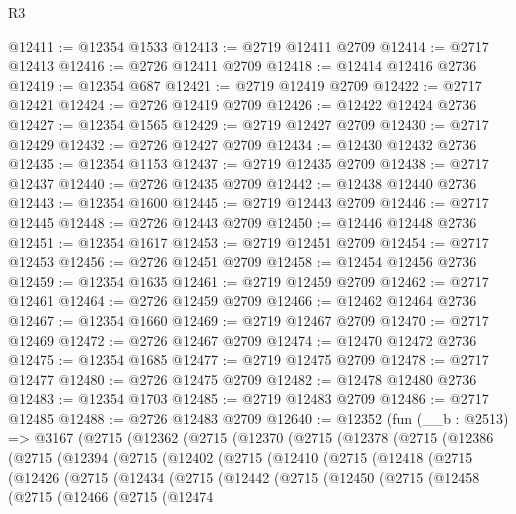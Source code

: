 \begin{lexlean}{R3}
\begin{coremodule}
@12411 := @12354 @1533
@12413 := @2719 @12411 @2709
@12414 := @2717 @12413
@12416 := @2726 @12411 @2709
@12418 := @12414 @12416 @2736
@12419 := @12354 @687
@12421 := @2719 @12419 @2709
@12422 := @2717 @12421
@12424 := @2726 @12419 @2709
@12426 := @12422 @12424 @2736
@12427 := @12354 @1565
@12429 := @2719 @12427 @2709
@12430 := @2717 @12429
@12432 := @2726 @12427 @2709
@12434 := @12430 @12432 @2736
@12435 := @12354 @1153
@12437 := @2719 @12435 @2709
@12438 := @2717 @12437
@12440 := @2726 @12435 @2709
@12442 := @12438 @12440 @2736
@12443 := @12354 @1600
@12445 := @2719 @12443 @2709
@12446 := @2717 @12445
@12448 := @2726 @12443 @2709
@12450 := @12446 @12448 @2736
@12451 := @12354 @1617
@12453 := @2719 @12451 @2709
@12454 := @2717 @12453
@12456 := @2726 @12451 @2709
@12458 := @12454 @12456 @2736
@12459 := @12354 @1635
@12461 := @2719 @12459 @2709
@12462 := @2717 @12461
@12464 := @2726 @12459 @2709
@12466 := @12462 @12464 @2736
@12467 := @12354 @1660
@12469 := @2719 @12467 @2709
@12470 := @2717 @12469
@12472 := @2726 @12467 @2709
@12474 := @12470 @12472 @2736
@12475 := @12354 @1685
@12477 := @2719 @12475 @2709
@12478 := @2717 @12477
@12480 := @2726 @12475 @2709
@12482 := @12478 @12480 @2736
@12483 := @12354 @1703
@12485 := @2719 @12483 @2709
@12486 := @2717 @12485
@12488 := @2726 @12483 @2709
@12640 := @12352
    (fun (__b : @2513) =>
    @3167
      (@2715
        (@12362
          (@2715
            (@12370
              (@2715
                (@12378
                  (@2715
                    (@12386
                      (@2715
                        (@12394
                          (@2715
                            (@12402
                              (@2715
                                (@12410
                                  (@2715
                                    (@12418
                                      (@2715
                                        (@12426
                                          (@2715
                                            (@12434
                                              (@2715
                                                (@12442
                                                  (@2715
                                                    (@12450
                                                      (@2715
                                                        (@12458
                                                          (@2715
                                                            (@12466
                                                              (@2715
                                                                (@12474

\end{coremodule}
\end{lexlean}
